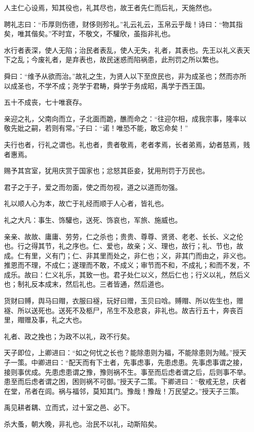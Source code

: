 \documentclass[]{article}
\begin{document}
人主仁心设焉，知其役也，礼其尽也，故王者先仁而后礼，天施然也。

聘礼志曰：``币厚则伤德，财侈则殄礼。''礼云礼云，玉帛云乎哉！诗曰：``物其指矣，唯其偕矣。''不时宜，不敬文，不驩欣，虽指非礼也。

水行者表深，使人无陷；治民者表乱，使人无失，礼者，其表也。先王以礼义表天下之乱；今废礼者，是弃表也，故民迷惑而陷祸患，此刑罚之所以繁也。

舜曰：``维予从欲而治。''故礼之生，为贤人以下至庶民也，非为成圣也；然而亦所以成圣也，不学不成；尧学于君畴，舜学于务成昭，禹学于西王国。

五十不成丧，七十唯衰存。

亲迎之礼，父南向而立，子北面而跪，醮而命之：``往迎尔相，成我宗事，隆率以敬先妣之嗣，若则有常。''子曰：``诺！唯恐不能，敢忘命矣！''

夫行也者，行礼之谓也。礼也者，贵者敬焉，老者孝焉，长者弟焉，幼者慈焉，贱者惠焉。

赐予其宫室，犹用庆赏于国家也；忿怒其臣妾，犹用刑罚于万民也。

君子之于子，爱之而勿面，使之而勿视，道之以道而勿强。

礼以顺人心为本，故亡于礼经而顺于人心者，皆礼也。

礼之大凡：事生、饰驩也，送死、饰哀也，军旅、施威也。

亲亲、故故、庸庸、劳劳，仁之杀也；贵贵、尊尊、贤贤、老老、长长、义之伦也。行之得其节，礼之序也。仁、爱也，故亲；义、理也，故行；礼、节也，故成。仁有里，义有门；仁、非其里而处之，非仁也；义，非其门而由之，非义也。推恩而不理，不成仁；遂理而不敢，不成义；审节而不和，不成礼；和而不发，不成乐。故曰：仁义礼乐，其致一也。君子处仁以义，然后仁也；行义以礼，然后义也；制礼反本成末，然后礼也。三者皆通，然后道也。

货财曰赙，舆马曰赗，衣服曰襚，玩好曰赠，玉贝曰唅。赙赗、所以佐生也，赠襚、所以送死也。送死不及柩尸，吊生不及悲哀，非礼也。故吉行五十，奔丧百里，赗赠及事，礼之大也。

礼者、政之挽也；为政不以礼，政不行矣。

天子即位，上卿进曰：``如之何忧之长也？能除患则为福，不能除患则为贼。''授天子一策。中卿进曰：``配天而有下土者，先事虑事，先患虑患。先事虑事谓之接，接则事优成。先患虑患谓之豫，豫则祸不生。事至而后虑者谓之后，后则事不举。患至而后虑者谓之困，困则祸不可御。''授天子二策。下卿进曰：``敬戒无怠，庆者在堂，吊者在闾。祸与福邻，莫知其门。豫哉！豫哉！万民望之。''授天子三策。

禹见耕者耦、立而式，过十室之邑、必下。

杀大蚤，朝大晚，非礼也。治民不以礼，动斯陷矣。
\end{document}
